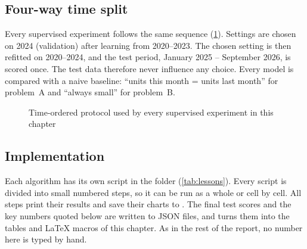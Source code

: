 \subsection{Four-way time split}
Every supervised experiment follows the same sequence (\cref{fig:split}). Settings are chosen on 2024
(validation) after learning from 2020--2023. The chosen setting is then refitted on 2020--2024, and the test
period, January 2025 -- September 2026, is scored once. The test data therefore never influence any choice.
Every model is compared with a naive baseline: ``units this month = units last month'' for problem~A and
``always small'' for problem~B.

\begin{figure}[htbp]\centering
{}
\caption{Time-ordered protocol used by every supervised experiment in this chapter}\label{fig:split}
\end{figure}

\subsection{Implementation}
Each algorithm has its own script in the folder  (\cref{tab:lessons}). Every script is divided
into small numbered steps, so it can be run as a whole or cell by cell. All steps print their results and save
their charts to . The final test scores and the key numbers quoted below are written
to JSON files, and  turns them into the tables and \LaTeX{} macros of this
chapter. As in the rest of the report, no number here is typed by hand.

